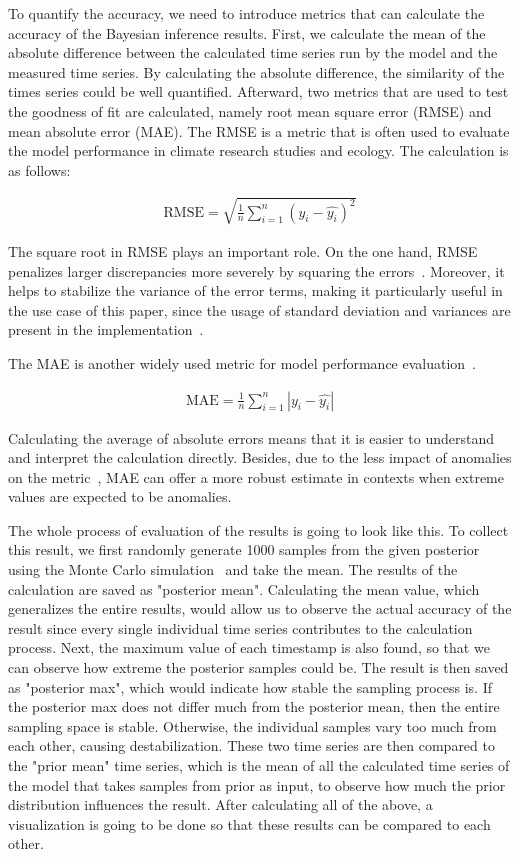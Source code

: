 To quantify the accuracy, we need to introduce metrics that can calculate the accuracy of the Bayesian inference results. First, we calculate the mean of the absolute difference between the calculated time series run by the model and the measured time series. By calculating the absolute difference, the similarity of the times series could be well quantified. Afterward, two metrics that are used to test the goodness of fit are calculated, namely root mean square error (RMSE) and mean absolute error (MAE). The RMSE is a metric that is often used to evaluate the model performance in climate research studies and ecology. The calculation is as follows: 

\begin{align}
\text{RMSE} = \sqrt{\frac 1 n \sum_{i=1}^n (y_i - \hat{y_i})^2}
\end{align}

The square root in RMSE plays an important role. On the one hand, RMSE penalizes larger discrepancies more severely by squaring the errors~\cite{RMSE_discrepency_penalty}. Moreover, it helps to stabilize the variance of the error terms, making it particularly useful in the use case of this paper, since the usage of standard deviation and variances are present in the implementation~\cite{RMSE_MAE}.

The MAE is another widely used metric for model performance evaluation~\cite{RMSE_MAE}.

\begin{align}
\text{MAE} = \frac 1 n \sum_{i=1}^n |y_i - \hat{y_i}|
\end{align}

Calculating the average of absolute errors means that it is easier to understand and interpret the calculation directly. Besides, due to the less impact of anomalies on the metric~\cite{RMSE_MAE}, MAE can offer a more robust estimate in contexts when extreme values are expected to be anomalies.

The whole process of evaluation of the results is going to look like this. 
To collect this result, we first randomly generate 1000 samples from the given posterior using the Monte Carlo simulation~\cite{monte_carlo_simulation} and take the mean. The results of the calculation are saved as "posterior mean". Calculating the mean value, which generalizes the entire results, would allow us to observe the actual accuracy of the result since every single individual time series contributes to the calculation process. Next, the maximum value of each timestamp is also found, so that we can observe how extreme the posterior samples could be. The result is then saved as "posterior max", which would indicate how stable the sampling process is. If the posterior max does not differ much from the posterior mean, then the entire sampling space is stable. Otherwise, the individual samples vary too much from each other, causing destabilization. These two time series are then compared to the "prior mean" time series, which is the mean of all the calculated time series of the model that takes samples from prior as input, to observe how much the prior distribution influences the result. After calculating all of the above, a visualization is going to be done so that these results can be compared to each other. 

